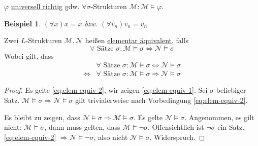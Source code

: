 \documentclass{article}
\theoremstyle{definition}
\theoremstyle{plain}
\newtheorem*{bsp}{Beispiel}
\newcommand{\m}[1]{\mathcal{#1}}
\begin{document}
    $ \varphi $ \underline{universell richtig} gdw. $ \forall \sigma$-Strukturen $ \m{M}: \m{M} \models \varphi $.
    \begin{bsp}
        $ (\forall x) x = x $ bzw. $ (\forall v_n) v_n = v_n $
    \end{bsp}

    Zwei $ L $-Strukturen $ \m{M}, \m{N} $ heißen \underline{elementar äquivalent}, falls
    \begin{equation*}
        \forall \text{ Sätze } \sigma: \m{M} \models \sigma \Leftrightarrow \m{N} \models \sigma
    \end{equation*}
    Wobei gilt, dass
    \begin{align}
        & \forall \text{ Sätze } \sigma: \m{M} \models \sigma \Leftrightarrow \m{N} \models \sigma \label{eq:elem-equiv-1} \\
        \Leftrightarrow & \forall \text{ Sätze } \sigma: \m{M} \models \sigma \Rightarrow \m{N} \models \sigma \label{eq:elem-equiv-2}
    \end{align}

    \begin{proof}
        Es gelte \eqref{eq:elem-equiv-2}, wir zeigen \eqref{eq:elem-equiv-1}.
        Sei $ \sigma $ beliebiger Satz.
        $ \m{M} \models \sigma \Rightarrow \m{N} \models \sigma $
        gilt trivialerweise nach Vorbedingung \eqref{eq:elem-equiv-2}.

        Es bleibt zu zeigen, dass $ \m{N} \models \sigma \Rightarrow \m{M} \models \sigma $.
        Es gelte $ \m{N} \models \sigma $.
        Angenommen, es gilt nicht: $ \m{M} \models \sigma $, dann muss gelten, dass $ \m{M} \models \neg \sigma $.
        Offensichtlich ist $ \neg \sigma $ ein Satz.
        \eqref{eq:elem-equiv-2} $ \Rightarrow \m{N} \models \neg \sigma $, also nicht $ \m{N} \models \sigma $. Widerspruch.
    \end{proof}
\end{document}
